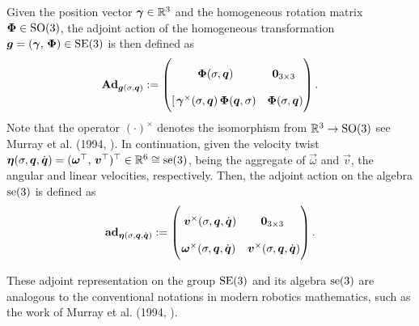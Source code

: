 \noindent Given the position vector ${\boldsymbol{\gamma}} \in \mathbb{R}^3$ and the homogeneous rotation matrix ${\boldsymbol{\Phi}} \in \textup{\textrm{SO}}(3)$, the adjoint action of the homogeneous transformation $\boldsymbol{g} = ({\boldsymbol{\gamma}},\,{\boldsymbol{\Phi}}) \in \textup{\textrm{SE}}(3)$ is then defined as
%
\begin{equation}
\renewcommand*{\arraystretch}{2}{}
\Ad_{\vec{g}(\sigma,\q)} := \begin{pmatrix}
\; {\PhiB}(\sigma,\q) & \vec{0}_{3\times3} \; \\
[\hspace{0.5mm} \gammaB^{\times}(\sigma,{\q})\,{\PhiB}({\q},\sigma) & {\PhiB}(\sigma,{\q})
\end{pmatrix}. 
\label{eq:C2:adjoint_matrix}
\end{equation}
%
Note that the operator $(\cdot)^\times$ denotes the isomorphism from $\mathbb{R}^3 \to \textup{\textrm{SO}}(3)$ see Murray et al. (1994, \cite{Murray1994}). In continuation, given the velocity twist ${\boldsymbol{\eta}}(\sigma,{\boldsymbol{q}},{\dot{\boldsymbol{q}}}) = (\boldsymbol{\omega}^\top,\,\boldsymbol{v}^\top)^\top \in \mathbb{R}^6 \cong \textup{\textrm{se}}(3)$, being the aggregate of $\vec{\omega}$ and $\vec{v}$, the angular and linear velocities, respectively. Then, the adjoint action on the algebra $\textup{\textrm{se}}(3)$ is defined as
%
\begin{equation}
\renewcommand*{\arraystretch}{2}{}
\ad_{\etaB(\sigma,\q,\dq)} := \begin{pmatrix}
\; \vB^{\times}(\sigma,\q,\dq) & \vec{0}_{3\times3} \; \\
 \vec{\omega}^{\times}(\sigma,\q,\dq) & \vB^{\times} (\sigma,\q,\dq)
\end{pmatrix}. 
\label{eq:C2:adjoint_matrix_algebra}
\end{equation}
%

\noindent These adjoint representation on the group $\textup{\textrm{SE}}(3)$ and its algebra $\textup{\textrm{se}}(3)$ are analogous to the conventional notations in modern robotics mathematics, such as the work of Murray et al. (1994, \cite{Murray1994}).


